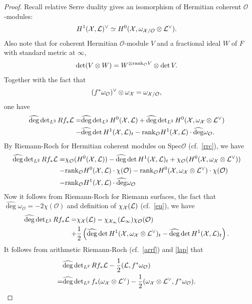 \documentclass[]{amsart}
\newcommand{\CO}{{\mathcal {O}}} \newcommand{\CP}{{\mathcal {P}}}
\newcommand{\Spec}{{\mathrm{Spec}}} \newcommand{\Spf}{{\mathrm{Spf}}}
\newcommand{\wh}{\widehat}
\theoremstyle{plain}
\theoremstyle{remark} \newtheorem{remark}[thm]{Remark}
\theoremstyle{remark} \newtheorem{exercise}{Exercise}
\theoremstyle{remark} \newtheorem{example}{Example}
\numberwithin{equation}{section}
\begin{document}
\begin{proof}
Recall relative Serre duality gives an isomorphism of Hermitian coherent $\CO$-modules:
  \[H^1(\CX,\CL)^\vee\simeq H^0(\CX,\omega_{\CX/\CO}\otimes \CL^\vee).\]
  Also note that for coherent Hermitian $\CO$-module $V$ and  a fractional ideal $W$ of $F$ with standard metric at $\infty$, \[\det(V\otimes W)=W^{\otimes\rank_{\CO}V}\otimes \det V.\] Together with the fact that \[(f^*\omega_\CO)^{\vee}\otimes \omega_\CX=\omega_{\CX/\CO},\] one have 
  \[\begin{aligned}
    \wh{\deg}\det\nolimits_{L^2} Rf_* \CL=&\wh{\deg}\det\nolimits_{L^2} H^0(\CX,\CL)+\wh{\deg}\det\nolimits_{L^2} H^0(\CX,\omega_{\CX}\otimes \CL^{\vee})\\
    -&\wh{\deg}\det H^1(\CX,\CL)_t-\rank_{\CO}H^1(\CX,\CL)\cdot\wh{\deg}\omega_\CO.
  \end{aligned}\]
  By Riemann-Roch for Hermitian coherent modules on $\Spec \CO$ (cf.~\eqref{rrc}), we have 
  \[\begin{aligned}
  \wh{\deg}\det\nolimits_{L^2} Rf_* \CL=&\chi_\CO(H^0(\CX,\CL))-\wh{\deg}\det H^1(\CX,\CL)_t+\chi_\CO( H^0(\CX,\omega_{\CX}\otimes \CL^\vee))\\
  -&\rank_{\CO}H^0(\CX,\CL)\cdot\chi(\CO)-\rank_{\CO}H^0(\CX,\omega_{\CX}\otimes \CL^\vee)\cdot\chi(\CO)\\
  -&\rank_{\CO}H^1(\CX,\CL)\cdot \wh{\deg}\omega_\CO
  \end{aligned}\]
  Now it follows from Riemann-Roch for Riemann surfaces, the fact that $\wh{\deg}\omega_\CO=-2\chi(\CO)$ and definition of $\chi_{{\mathcal {X}}}({\mathcal {L}})$ (cf.~\eqref{eu}), we have
  \begin{equation}\label{eq1}\begin{aligned}
    \wh{\deg}\det\nolimits_{L^2} Rf_* \CL=&\chi_{\CX}(\CL)-\chi_{\CX_\infty}(\CL_\infty)\chi_{\CO}(\CO)\\
    +&\frac{1}{2}\left(\wh{\deg}\det H^1(\CX,\omega_{\CX}\otimes \CL^\vee)_t-\wh{\deg}\det H^1(\CX,\CL)_t\right).
  \end{aligned}\end{equation} 
It follows from arithmetic Riemann-Roch (cf.~\eqref{arrf}) and \eqref{lap} that
  \begin{equation}\label{eq2}
    \begin{aligned}
     &\wh{\deg}\det\nolimits_{L^2}Rf_*\CL-\frac{1}{2}(\CL,f^*\omega_{\CO})\\
    =&\wh{\deg}\det\nolimits_{L^2}f_*(\omega_{\CX}\otimes\CL^\vee)-\frac{1}{2}(\omega_{\CX}\otimes\CL^\vee,f^*\omega_{\CO}). 
    \end{aligned}\end{equation}

\end{proof}
\end{document}
